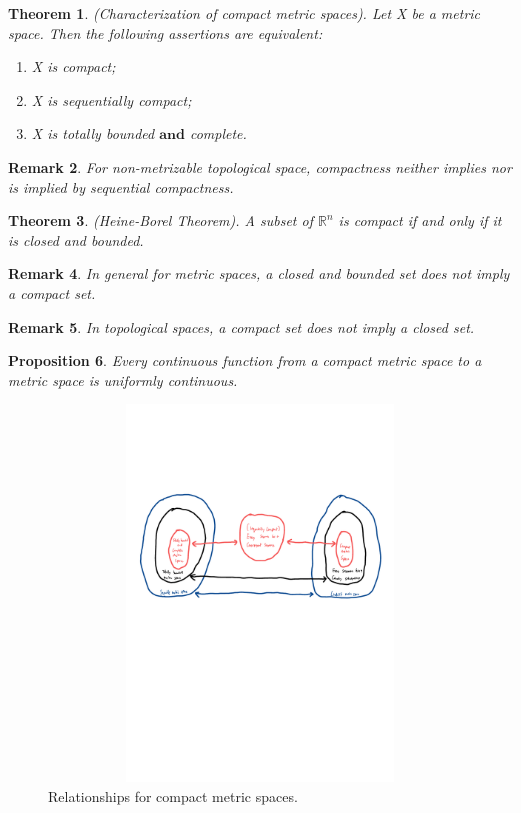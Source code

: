 \documentclass[twoside]{article}
\newcounter{lecnum}
\newtheorem{theorem}{Theorem}[lecnum]
\newtheorem{proposition}[theorem]{Proposition}
\newtheorem{remark}[theorem]{Remark}
\begin{document}
\begin{theorem}(Characterization of compact metric spaces). Let X be a metric space. Then the following assertions are equivalent:
\begin{enumerate}
\item X is compact;
\item X is sequentially compact;
\item X is totally bounded $\textbf{and}$ complete.
\end{enumerate}
\end{theorem}

\begin{remark}For non-metrizable topological space, compactness neither implies nor is implied by sequential compactness.
\end{remark}

\begin{theorem}(Heine-Borel Theorem). A subset of $\mathbb{R}^n$ is compact if and only if it is closed and bounded.
\end{theorem}

\begin{remark}In general for metric spaces, a closed and bounded set does not imply a compact set.
\end{remark}

\begin{remark}In topological spaces, a compact set does not imply a closed set.
\end{remark}

\begin{proposition}Every continuous function from a compact metric space to a metric space is uniformly continuous.
\end{proposition}

\begin{center}
\begin{figure}
\includegraphics[height=10cm, width=15cm]{Compactness-Characterisation}
\caption{Relationships for compact metric spaces.}
\end{figure}
\end{center}
\end{document}
